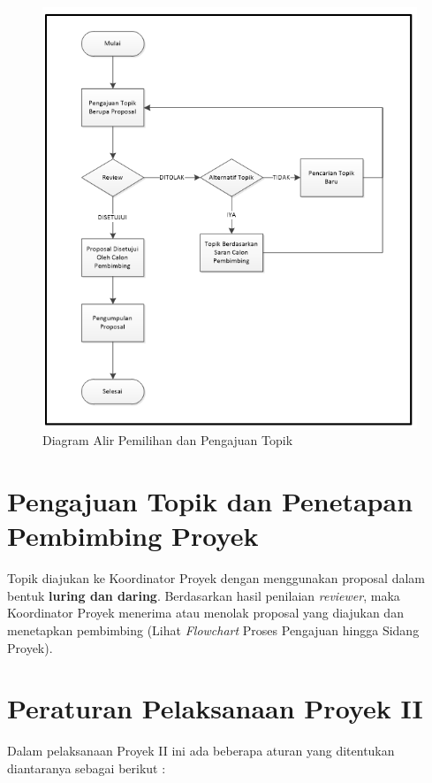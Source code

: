 \begin{figure}[H]
    \centering
    \includegraphics[scale=0.7]{figures/alur.png}
    \caption{Diagram Alir Pemilihan dan Pengajuan Topik}
    \label{alir}
\end{figure}

\section{Pengajuan Topik dan Penetapan Pembimbing Proyek}
Topik diajukan ke Koordinator Proyek dengan	menggunakan	proposal dalam	bentuk \textbf{luring dan daring}. Berdasarkan hasil penilaian \textit{reviewer}, maka Koordinator Proyek menerima atau menolak proposal yang diajukan dan menetapkan pembimbing (Lihat \textit{Flowchart} Proses Pengajuan hingga Sidang Proyek).

\section{Peraturan Pelaksanaan Proyek II}
Dalam pelaksanaan Proyek II	ini	ada	beberapa aturan	yang ditentukan	diantaranya	sebagai	berikut	:

